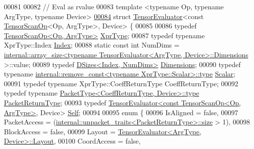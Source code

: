 \begin{DoxyCode}
00081 
00082 \textcolor{comment}{// Eval as rvalue}
00083 \textcolor{keyword}{template} <\textcolor{keyword}{typename} Op, \textcolor{keyword}{typename} ArgType, \textcolor{keyword}{typename} Device>
\hyperlink{struct_eigen_1_1_tensor_evaluator_3_01const_01_tensor_scan_op_3_01_op_00_01_arg_type_01_4_00_01_device_01_4}{00084} \textcolor{keyword}{struct }\hyperlink{struct_eigen_1_1_tensor_evaluator}{TensorEvaluator}<const \hyperlink{class_eigen_1_1_tensor_scan_op}{TensorScanOp}<Op, ArgType>, Device> \{
00085 
00086   \textcolor{keyword}{typedef} \hyperlink{class_eigen_1_1_tensor_scan_op}{TensorScanOp<Op, ArgType>} \hyperlink{class_eigen_1_1_tensor_scan_op}{XprType};
00087   \textcolor{keyword}{typedef} \textcolor{keyword}{typename} XprType::Index \hyperlink{namespace_eigen_a62e77e0933482dafde8fe197d9a2cfde}{Index};
00088   \textcolor{keyword}{static} \textcolor{keyword}{const} \textcolor{keywordtype}{int} NumDims = 
      \hyperlink{struct_eigen_1_1internal_1_1array__size}{internal::array\_size<typename TensorEvaluator<ArgType, Device>::Dimensions}
      >::value;
00089   \textcolor{keyword}{typedef} \hyperlink{struct_eigen_1_1_d_sizes}{DSizes<Index, NumDims>} \hyperlink{struct_eigen_1_1_d_sizes}{Dimensions};
00090   \textcolor{keyword}{typedef} \textcolor{keyword}{typename} \hyperlink{group___sparse_core___module}{internal::remove\_const<typename XprType::Scalar>::type}
       \hyperlink{group___sparse_core___module}{Scalar};
00091   \textcolor{keyword}{typedef} \textcolor{keyword}{typename} XprType::CoeffReturnType CoeffReturnType;
00092   \textcolor{keyword}{typedef} \textcolor{keyword}{typename} \hyperlink{group___sparse_core___module}{PacketType<CoeffReturnType, Device>::type} 
      \hyperlink{group___sparse_core___module}{PacketReturnType};
00093   \textcolor{keyword}{typedef} \hyperlink{struct_eigen_1_1_tensor_evaluator}{TensorEvaluator<const TensorScanOp<Op, ArgType>}, 
      Device> \hyperlink{struct_eigen_1_1_tensor_evaluator_3_01const_01_tensor_scan_op_3_01_op_00_01_arg_type_01_4_00_01_device_01_4}{Self};
00094 
00095   \textcolor{keyword}{enum} \{
00096     IsAligned = \textcolor{keyword}{false},
00097     PacketAccess = (\hyperlink{struct_eigen_1_1internal_1_1unpacket__traits}{internal::unpacket\_traits<PacketReturnType>::size}
       > 1),
00098     BlockAccess = \textcolor{keyword}{false},
00099     Layout = \hyperlink{struct_eigen_1_1_tensor_evaluator}{TensorEvaluator<ArgType, Device>::Layout},
00100     CoordAccess = \textcolor{keyword}{false},

\end{DoxyCode}
